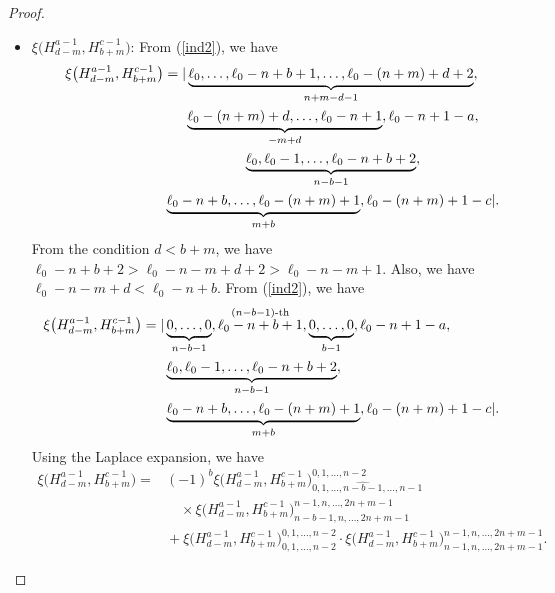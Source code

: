 \documentclass[10pt,a4paper]{amsart}
\numberwithin{equation}{section}
\begin{document}
\begin{proof}
\begin{itemize}
\item $\xi\bigl(H^{a-1}_{d-m}, H^{c-1}_{b+m}\bigr)$: From (\ref{ind2}), we have
\begin{gather*}
\xi\bigl(H^{a-1}_{d-m}, H^{c-1}_{b+m}\bigr)=|\underbrace{\ell_{0},\dots,\ell_{0}-n+b+1,\dots,\ell_0-(n+m)+d+2}_{n+m-d-1},\nonumber\\
\hphantom{\xi\bigl(H^{a-1}_{d-m}, H^{c-1}_{b+m}\bigr)=|}{}
\underbrace{\ell_{0}-(n+m)+d,\dots,\ell_{0}-n+1}_{-m+d},\ell_{0}-n+1-a,\nonumber\\
\hphantom{\xi\bigl(H^{a-1}_{d-m}, H^{c-1}_{b+m}\bigr)=|}{}
\underbrace{\ell_{0},\ell_{0}-1,\dots,\ell_{0}-n+b+2}_{n-b-1},\nonumber\\
\hphantom{\xi\bigl(H^{a-1}_{d-m}, H^{c-1}_{b+m}\bigr)=|}{}
\underbrace{\ell_{0}-n+b,\dots,\ell_{0}-(n+m)+1}_{m+b},\ell_{0}-(n+m)+1-c|.
\end{gather*}
From the condition $d<b+m$, we have $\ell_0-n+b+2>\ell_0-n-m+d+2>\ell_0-n-m+1$. Also, we have $\ell_0-n-m+d<\ell_0-n+b$. From (\ref{ind2}), we have
\begin{gather*}
\begin{split}
& \xi\bigl(H^{a-1}_{d-m}, H^{c-1}_{b+m}\bigr)=|\underbrace{0,\dots,0}_{n-b-1},\stackrel{(n-b-1)\text{-th}}{\ell_{0}-n+b+1}, \underbrace{0,\dots,0}_{b-1},\ell_{0}-n+1-a,\\
& \hphantom{\xi\bigl(H^{a-1}_{d-m}, H^{c-1}_{b+m}\bigr)=|}{}
\underbrace{\ell_{0},\ell_{0}-1,\dots,\ell_{0}-n+b+2}_{n-b-1},\\
& \hphantom{\xi\bigl(H^{a-1}_{d-m}, H^{c-1}_{b+m}\bigr)=|}{}
\underbrace{\ell_{0}-n+b,\dots,\ell_{0}-(n+m)+1}_{m+b},\ell_{0}-(n+m)+1-c|.
\end{split}
\end{gather*}
Using the Laplace expansion, we have
\begin{align*}
\xi\bigl(H^{a-1}_{d-m}, H^{c-1}_{b+m}\bigr)={}&
{(-1)}^{b}\xi\bigl(H^{a-1}_{d-m}, H^{c-1}_{b+m}\bigr)^{0,1,\dots,n-2}_{0,1,\dots,\widehat{n-b-1},\dots,n-1}\\
&\quad{}\times
 \xi\bigl(H^{a-1}_{d-m}, H^{c-1}_{b+m}\bigr)^{n-1,n,\dots,2n+m-1}_{n-b-1,n,\dots,2n+m-1}\\
&{}+\xi\bigl(H^{a-1}_{d-m}, H^{c-1}_{b+m}\bigr)^{0,1,\dots,n-2}_{0,1,\dots,n-2}\cdot\xi\bigl(H^{a-1}_{d-m}, H^{c-1}_{b+m}\bigr)^{n-1,n,\dots,2n+m-1}_{n-1,n,\dots,2n+m-1}.
\end{align*}



\end{itemize}
\end{proof}
\end{document}
